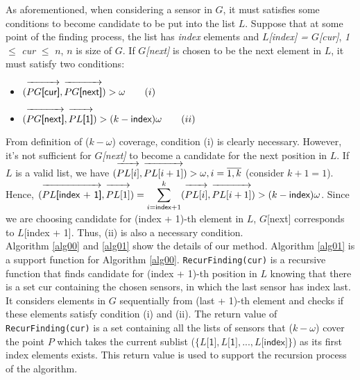 As aforementioned, when considering a sensor in $G$, it must satisfies some conditions to become candidate to be put into the list $L$. Suppose that at some point of the finding process, the list has {\sf\itshape index} elements and {\sf\itshape $L$[index] = $G$[cur]}, {\sf\itshape 1} $\leq$ {\sf\itshape cur} $\leq$ {\sf\itshape $n$}, $n$ is size of $G$. If {\sf\itshape $G$[next]} is chosen to be the next element in $L$, it must satisfy two conditions:
\begin{itemize}
	\item $(\overrightarrow{\vphantom{\overrightarrow{P}}PG\textsf{[cur]}}, \overrightarrow{\vphantom{\overrightarrow{P}}PG\textsf{[next]}}) > \omega \qquad (i)$
	\item $(\overrightarrow{\vphantom{\overrightarrow{P}}PG\textsf{[next]}}, \overrightarrow{\vphantom{\overrightarrow{P}}PL\textsf{[1]}}) > (k-\textsf{index})\omega \qquad (ii)$
\end{itemize}
From definition of ($k-\omega$) coverage, condition (i) is clearly necessary. However, it's not sufficient for {\sf\itshape $G$[next]} to become a candidate for the next position in $L$. If $L$ is a valid list, we have $(\overrightarrow{\vphantom{\overrightarrow{P}}PL[i]}, \overrightarrow{\vphantom{\overrightarrow{P}}PL[i+1]}) > \omega, i = \overline{1,k}$ (consider $k + 1 = 1$). Hence, $(\overrightarrow{\vphantom{\overrightarrow{P}}PL\textsf{[index + 1]}}, \overrightarrow{\vphantom{\overrightarrow{P}}PL[1]}) = \displaystyle\sum\limits_{i=\textsf{\scriptsize index} + 1}^{k}(\overrightarrow{\vphantom{\overrightarrow{P}}PL[i]}, \overrightarrow{\vphantom{\overrightarrow{P}}PL[i+1]}) > (k-\textsf{index})\omega$.
Since we are choosing candidate for {\sf (index + 1)-th} element in $L$, {\sf $G$[next]} corresponds to {\sf $L$[index + 1]}. Thus, (ii) is also a necessary condition.\\[7pt]
Algorithm \ref{alg00} and \ref{alg01} show the details of our method. Algorithm \ref{alg01} is a support function for Algorithm \ref{alg00}. {\tt RecurFinding(cur)} is a recursive function that finds candidate for {\sf (index + 1)-th} position in $L$ knowing that there is a set {\sf cur} containing the chosen sensors, in which the last sensor has index {\sf last}. It considers elements in $G$ sequentially from {\sf (last + 1)-th} element and checks if these elements satisfy condition (i) and (ii). The return value of {\tt RecurFinding(cur)} is a set containing all the lists of sensors that ($k-\omega$) cover the point $P$ which takes the current sublist ($\{L\textsf{[1]}, L\textsf{[1]},..., L\textsf{[index]}\}$) as its first {\sf index} elements exists. This return value is used to support the recursion process of the algorithm.

